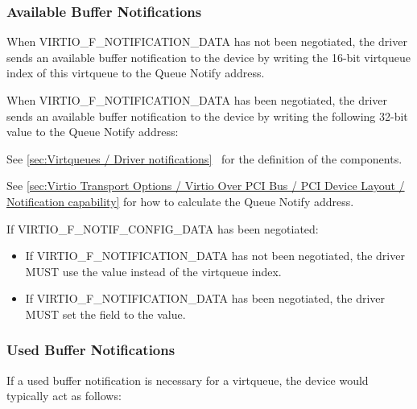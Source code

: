 \subsubsection{Available Buffer Notifications}\label{sec:Virtio Transport Options / Virtio Over PCI Bus / PCI-specific Initialization And Device Operation / Available Buffer Notifications}

When VIRTIO_F_NOTIFICATION_DATA has not been negotiated,
the driver sends an available buffer notification to the device by writing
the 16-bit virtqueue index
of this virtqueue to the Queue Notify address.

When VIRTIO_F_NOTIFICATION_DATA has been negotiated,
the driver sends an available buffer notification to the device by writing
the following 32-bit value to the Queue Notify address:


See \ref{sec:Virtqueues / Driver notifications}~
for the definition of the components.

See \ref{sec:Virtio Transport Options / Virtio Over PCI Bus / PCI Device Layout / Notification capability}
for how to calculate the Queue Notify address.

If VIRTIO_F_NOTIF_CONFIG_DATA has been negotiated:
\begin{itemize}
\item If VIRTIO_F_NOTIFICATION_DATA has not been negotiated, the driver MUST use the
 value instead of the virtqueue index.
\item If VIRTIO_F_NOTIFICATION_DATA has been negotiated, the driver MUST set the
 field to the  value.
\end{itemize}

\subsubsection{Used Buffer Notifications}\label{sec:Virtio Transport Options / Virtio Over PCI Bus / PCI-specific Initialization And Device Operation / Used Buffer Notifications}

If a used buffer notification is necessary for a virtqueue, the device would typically act as follows:

